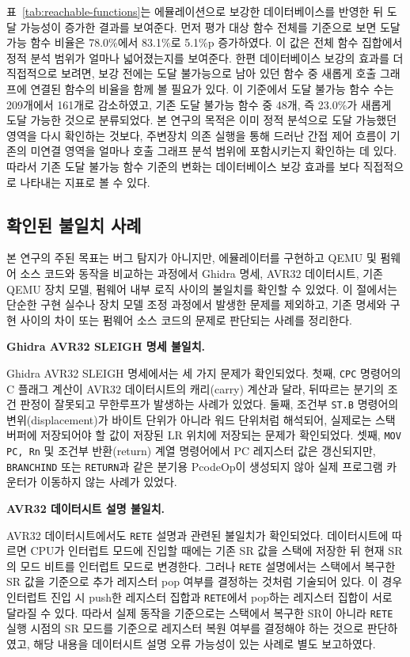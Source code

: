 \documentclass[master,korean,final]{kaist-ucs}
\begin{document}
표~\ref{tab:reachable-functions}는 에뮬레이션으로 보강한 데이터베이스를 반영한 뒤 도달 가능성이 증가한 결과를 보여준다. 먼저 평가 대상 함수 전체를 기준으로 보면 도달 가능 함수 비율은 78.0\%에서 83.1\%로 5.1\%p 증가하였다. 이 값은 전체 함수 집합에서 정적 분석 범위가 얼마나 넓어졌는지를 보여준다. 한편 데이터베이스 보강의 효과를 더 직접적으로 보려면, 보강 전에는 도달 불가능으로 남아 있던 함수 중 새롭게 호출 그래프에 연결된 함수의 비율을 함께 볼 필요가 있다. 이 기준에서 도달 불가능 함수 수는 209개에서 161개로 감소하였고, 기존 도달 불가능 함수 중 48개, 즉 23.0\%가 새롭게 도달 가능한 것으로 분류되었다. 본 연구의 목적은 이미 정적 분석으로 도달 가능했던 영역을 다시 확인하는 것보다, 주변장치 의존 실행을 통해 드러난 간접 제어 흐름이 기존의 미연결 영역을 얼마나 호출 그래프 분석 범위에 포함시키는지 확인하는 데 있다. 따라서 기존 도달 불가능 함수 기준의 변화는 데이터베이스 보강 효과를 보다 직접적으로 나타내는 지표로 볼 수 있다.

\subsection{확인된 불일치 사례}

본 연구의 주된 목표는 버그 탐지가 아니지만, 에뮬레이터를 구현하고 QEMU 및 펌웨어 소스 코드와 동작을 비교하는 과정에서 Ghidra 명세, AVR32 데이터시트, 기존 QEMU 장치 모델, 펌웨어 내부 로직 사이의 불일치를 확인할 수 있었다. 이 절에서는 단순한 구현 실수나 장치 모델 조정 과정에서 발생한 문제를 제외하고, 기존 명세와 구현 사이의 차이 또는 펌웨어 소스 코드의 문제로 판단되는 사례를 정리한다.

\noindent\textbf{Ghidra AVR32 SLEIGH 명세 불일치.}\par
Ghidra AVR32 SLEIGH 명세에서는 세 가지 문제가 확인되었다. 첫째, \texttt{CPC} 명령어의 C 플래그 계산이 AVR32 데이터시트의 캐리(carry) 계산과 달라, 뒤따르는 분기의 조건 판정이 잘못되고 무한루프가 발생하는 사례가 있었다. 둘째, 조건부 \texttt{ST.B} 명령어의 변위(displacement)가 바이트 단위가 아니라 워드 단위처럼 해석되어, 실제로는 스택 버퍼에 저장되어야 할 값이 저장된 LR 위치에 저장되는 문제가 확인되었다. 셋째, \texttt{MOV PC, Rn} 및 조건부 반환(return) 계열 명령어에서 PC 레지스터 값은 갱신되지만, \texttt{BRANCHIND} 또는 \texttt{RETURN}과 같은 분기용 PcodeOp이 생성되지 않아 실제 프로그램 카운터가 이동하지 않는 사례가 있었다.

\noindent\textbf{AVR32 데이터시트 설명 불일치.}\par
AVR32 데이터시트에서도 \texttt{RETE} 설명과 관련된 불일치가 확인되었다. 데이터시트에 따르면 CPU가 인터럽트 모드에 진입할 때에는 기존 SR 값을 스택에 저장한 뒤 현재 SR의 모드 비트를 인터럽트 모드로 변경한다. 그러나 \texttt{RETE} 설명에서는 스택에서 복구한 SR 값을 기준으로 추가 레지스터 pop 여부를 결정하는 것처럼 기술되어 있다. 이 경우 인터럽트 진입 시 push한 레지스터 집합과 \texttt{RETE}에서 pop하는 레지스터 집합이 서로 달라질 수 있다. 따라서 실제 동작을 기준으로는 스택에서 복구한 SR이 아니라 \texttt{RETE} 실행 시점의 SR 모드를 기준으로 레지스터 복원 여부를 결정해야 하는 것으로 판단하였고, 해당 내용을 데이터시트 설명 오류 가능성이 있는 사례로 별도 보고하였다.
\end{document}
